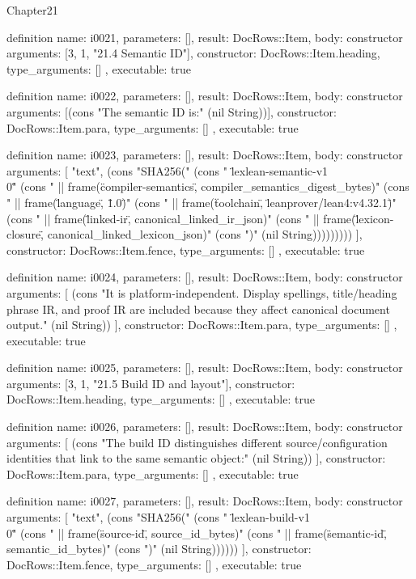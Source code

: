 \begin{lexlean}{Chapter21}
\begin{semanticmodule}
definition{
  name: i0021,
  parameters: [],
  result: DocRows::Item,
  body: constructor{
    arguments: [3, 1, "21.4 Semantic ID"],
    constructor: DocRows::Item.heading,
    type_arguments: []
  },
  executable: true
}

definition{
  name: i0022,
  parameters: [],
  result: DocRows::Item,
  body: constructor{
    arguments: [(cons "The semantic ID is:" (nil String))],
    constructor: DocRows::Item.para,
    type_arguments: []
  },
  executable: true
}

definition{
  name: i0023,
  parameters: [],
  result: DocRows::Item,
  body: constructor{
    arguments: [
      "text",
      (cons "SHA256(" (cons "  \"lexlean-semantic-v1\\0\"" (cons "  || frame(\"compiler-semantics\", compiler_semantics_digest_bytes)" (cons "  || frame(\"language\", \"1.0\")" (cons "  || frame(\"toolchain\", \"leanprover/lean4:v4.32.1\")" (cons "  || frame(\"linked-ir\", canonical_linked_ir_json)" (cons "  || frame(\"lexicon-closure\", canonical_linked_lexicon_json)" (cons ")" (nil String)))))))))
    ],
    constructor: DocRows::Item.fence,
    type_arguments: []
  },
  executable: true
}

definition{
  name: i0024,
  parameters: [],
  result: DocRows::Item,
  body: constructor{
    arguments: [
      (cons "It is platform-independent. Display spellings, title/heading phrase IR, and proof IR are included because they affect canonical document output." (nil String))
    ],
    constructor: DocRows::Item.para,
    type_arguments: []
  },
  executable: true
}

definition{
  name: i0025,
  parameters: [],
  result: DocRows::Item,
  body: constructor{
    arguments: [3, 1, "21.5 Build ID and layout"],
    constructor: DocRows::Item.heading,
    type_arguments: []
  },
  executable: true
}

definition{
  name: i0026,
  parameters: [],
  result: DocRows::Item,
  body: constructor{
    arguments: [
      (cons "The build ID distinguishes different source/configuration identities that link to the same semantic object:" (nil String))
    ],
    constructor: DocRows::Item.para,
    type_arguments: []
  },
  executable: true
}

definition{
  name: i0027,
  parameters: [],
  result: DocRows::Item,
  body: constructor{
    arguments: [
      "text",
      (cons "SHA256(" (cons "  \"lexlean-build-v1\\0\"" (cons "  || frame(\"source-id\", source_id_bytes)" (cons "  || frame(\"semantic-id\", semantic_id_bytes)" (cons ")" (nil String))))))
    ],
    constructor: DocRows::Item.fence,
    type_arguments: []
  },
  executable: true
}


\end{semanticmodule}
\end{lexlean}
